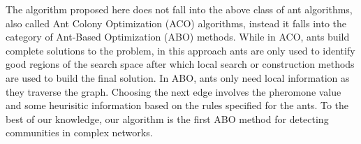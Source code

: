 \begin{spacing}{1.5}
\indent The algorithm proposed here does not fall into the above class of ant algorithms, also called Ant Colony Optimization (ACO) algorithms, instead it falls into the category of Ant-Based Optimization (ABO) methods. While in ACO, ants build complete solutions to the problem, in this approach ants are only used to identify good regions of the search space after which local search or construction methods are used to build the final solution. In ABO, ants only need local information as they traverse the graph. Choosing the next edge involves the pheromone value and some heurisitic information based on the rules specified for the ants. To the best of our knowledge, our algorithm is the first ABO method for detecting communities in complex networks.

\end{spacing}